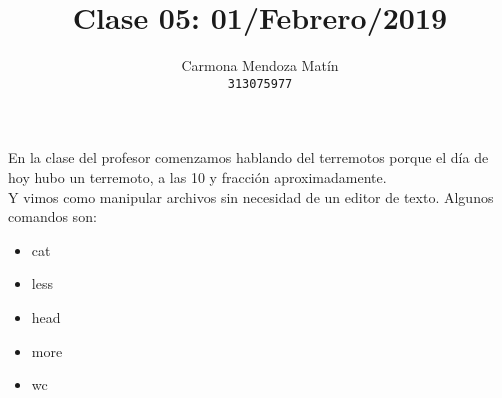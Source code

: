 \documentclass[11pt, a4paper]{report}
\begin{document}
\title{Clase 05: 01/Febrero/2019}
\author{
  Carmona Mendoza Mat\'in\\
  \texttt{313075977}
}
\date{}
\maketitle

En la clase del profesor comenzamos hablando del terremotos porque el d\'ia
de hoy hubo un terremoto, a las 10 y fracci\'on aproximadamente. \\

Y vimos como manipular archivos sin necesidad de un editor de texto. Algunos
comandos son: \\

\begin{itemize}
\item cat
\item less
\item head
\item more
\item wc
\end{itemize}
  
\end{document}
